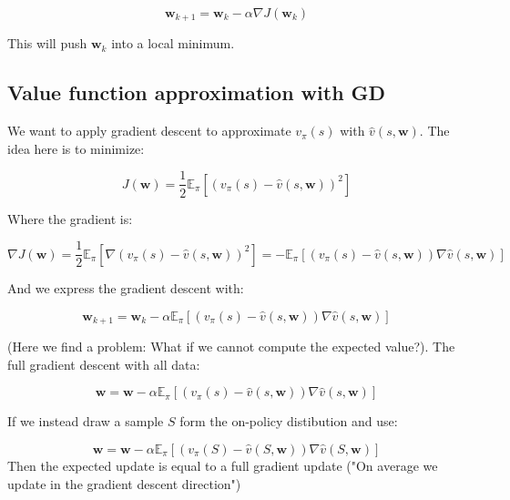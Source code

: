 	\begin{equation}
	 	\textbf{w}_{k+1} = \textbf{w}_k - \alpha \nabla J(\textbf{w}_k)
	 \end{equation} 

This will push $\textbf{w}_k$ into a local minimum. 

\subsection*{Value function approximation with GD}
We want to apply gradient descent to approximate $v_\pi(s)$ with $\hat{v}(s,\textbf{w})$. The idea here is to minimize:

	\begin{equation}
		J(\textbf{w}) = \frac{1} {2} \mathbb{E}_\pi[(v_\pi(s) - \hat{v}(s,\textbf{w}))^{2}]
	\end{equation}

Where the gradient is:

	\begin{equation}
		\nabla J(\textbf{w}) = \frac{1} {2} \mathbb{E}_\pi[\nabla (v_\pi(s) - \hat{v}(s,\textbf{w}))^{2}]= - \mathbb{E}_\pi [(v_\pi(s) - \hat{v}(s, \textbf{w}))\nabla \hat{v}(s,\textbf{w})]
	\end{equation}

And we express the gradient descent with:

	\begin{equation}
		\textbf{w}_{k+1} = \textbf{w}_k - \alpha \mathbb{E}_\pi [(v_\pi(s) - \hat{v}(s, \textbf{w}))\nabla \hat{v}(s,\textbf{w})]
	\end{equation}

(Here we find a problem: What if we cannot compute the expected value?). The full gradient descent with all data:

	\begin{equation}
		\textbf{w} = \textbf{w} - \alpha \mathbb{E}_\pi [(v_\pi(s) - \hat{v}(s, \textbf{w}))\nabla \hat{v}(s,\textbf{w})]
	\end{equation}

If we instead draw a sample $S$ form the on-policy distibution and use:

	\begin{equation}
		\textbf{w} = \textbf{w} - \alpha \mathbb{E}_\pi [(v_\pi(S) - \hat{v}(S, \textbf{w}))\nabla \hat{v}(S,\textbf{w})]
	\end{equation}
Then the expected update is equal to a full gradient update ("On average we update in the gradient descent direction")

